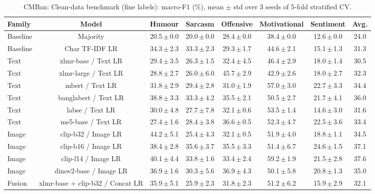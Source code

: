 \begin{table}[t]
\centering
\small
\caption{CMBan: Clean-data benchmark (fine labels): macro-F1 (\%), mean $\pm$ std over 3 seeds of 5-fold stratified CV.}
\label{tab:bench_fine_cmban}
\begin{adjustbox}{max width=\textwidth}
\begin{tabular}{lccccccc}
\toprule
Family & Model & Humour & Sarcasm & Offensive & Motivational & Sentiment & Avg. \\
\midrule
Baseline & Majority & 20.5\,$\pm$\,0.0 & 20.0\,$\pm$\,0.0 & 28.4\,$\pm$\,0.0 & 38.4\,$\pm$\,0.0 & 12.6\,$\pm$\,0.0 & 24.0 \\
Baseline & Char TF-IDF LR & 34.3\,$\pm$\,2.3 & 33.3\,$\pm$\,2.3 & 29.3\,$\pm$\,1.7 & 44.6\,$\pm$\,2.1 & 15.1\,$\pm$\,1.3 & 31.3 \\
Text & xlmr-base / Text LR & 29.4\,$\pm$\,3.5 & 26.3\,$\pm$\,1.5 & 32.4\,$\pm$\,4.5 & 46.4\,$\pm$\,2.9 & 18.0\,$\pm$\,1.4 & 30.5 \\
Text & xlmr-large / Text LR & 28.8\,$\pm$\,2.7 & 26.0\,$\pm$\,6.0 & 45.7\,$\pm$\,2.9 & 42.9\,$\pm$\,2.6 & 18.0\,$\pm$\,2.7 & 32.3 \\
Text & mbert / Text LR & 31.8\,$\pm$\,2.9 & 29.4\,$\pm$\,2.8 & 31.0\,$\pm$\,1.9 & 57.0\,$\pm$\,3.0 & 22.7\,$\pm$\,3.3 & 34.4 \\
Text & banglabert / Text LR & 38.8\,$\pm$\,3.3 & 33.3\,$\pm$\,4.2 & 35.5\,$\pm$\,2.1 & 50.5\,$\pm$\,2.7 & 21.7\,$\pm$\,4.1 & 36.0 \\
Text & labse / Text LR & 30.0\,$\pm$\,4.8 & 27.7\,$\pm$\,7.8 & 32.1\,$\pm$\,0.6 & 53.5\,$\pm$\,1.4 & 14.6\,$\pm$\,3.0 & 31.6 \\
Text & me5-base / Text LR & 27.4\,$\pm$\,1.6 & 28.4\,$\pm$\,3.8 & 36.6\,$\pm$\,0.5 & 52.3\,$\pm$\,4.7 & 22.5\,$\pm$\,3.6 & 33.4 \\
Image & clip-b32 / Image LR & 44.2\,$\pm$\,5.1 & 25.4\,$\pm$\,4.3 & 32.1\,$\pm$\,0.5 & 51.9\,$\pm$\,4.0 & 18.8\,$\pm$\,1.1 & 34.5 \\
Image & clip-b16 / Image LR & 38.4\,$\pm$\,2.8 & 35.6\,$\pm$\,3.7 & 35.5\,$\pm$\,3.3 & 51.4\,$\pm$\,6.7 & 24.6\,$\pm$\,1.5 & 37.1 \\
Image & clip-l14 / Image LR & 40.1\,$\pm$\,4.4 & 33.8\,$\pm$\,1.6 & 33.4\,$\pm$\,2.4 & 59.2\,$\pm$\,1.9 & 21.5\,$\pm$\,2.8 & 37.6 \\
Image & dinov2-base / Image LR & 36.9\,$\pm$\,1.6 & 30.3\,$\pm$\,5.6 & 36.9\,$\pm$\,4.3 & 50.1\,$\pm$\,5.8 & 20.8\,$\pm$\,1.3 & 35.0 \\
Fusion & xlmr-base + clip-b32 / Concat LR & 35.9\,$\pm$\,5.1 & 25.9\,$\pm$\,2.3 & 31.8\,$\pm$\,2.3 & 51.2\,$\pm$\,6.2 & 15.9\,$\pm$\,2.9 & 32.1 \\

\end{tabular}
\end{adjustbox}
\end{table}
